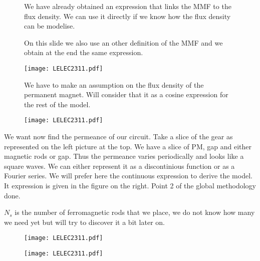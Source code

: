 \begin{figure}[H]
    \begin{minipage}{.45\linewidth}
        We have already obtained an expression that links the MMF to the flux density. We can use it directly if we know how the flux density can be modelise.
        
        On this slide we also use an other definition of the MMF and we obtain at the end the same expression.
    \end{minipage}
    \hfill%
    \begin{minipage}[c]{.45\linewidth}
        \centering
        \texttt{[image: LELEC2311.pdf]}
    \end{minipage}
\end{figure}

\begin{figure}[H]
    \begin{minipage}{.45\linewidth}
      We have to make an assumption on the flux density of the permanent magnet. Will consider that it as a cosine expression for the rest of the model.
    \end{minipage}
    \hfill%
    \begin{minipage}[c]{.45\linewidth}
        \centering
        \texttt{[image: LELEC2311.pdf]}
    \end{minipage}
\end{figure}

We want now find the permeance of our circuit. Take a slice of the gear as represented on the left picture at the top. We have a slice of PM, gap and either magnetic rods or gap. Thus the permeance varies periodically and looks like a square waves. We can either represent it as a discontinious function or as a Fourier series. We will prefer here the continuous expression to derive the model. It expression is given in the figure on the right. Point 2 of the global methodology done.

$N_s$ is the number of ferromagnetic rods that we place, we do not know how many we need yet but will try to discover it a bit later on.
\begin{figure}[H]
    \begin{minipage}{.45\linewidth}
        \texttt{[image: LELEC2311.pdf]}
    \end{minipage}
    \hfill%
    \begin{minipage}[c]{.45\linewidth}
        \centering
        \texttt{[image: LELEC2311.pdf]}
    \end{minipage}
\end{figure}


